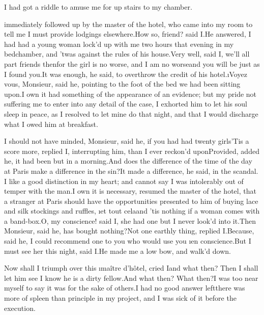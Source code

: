 \documentclass[twoside]{article}
\begin{document}
I had got a riddle to amuse me for\break
{}
up stairs to my chamber.






\vskip 6pt


 immediately followed up
by the master of the hotel, who came into
my room to tell me I must provide lodgings
elsewhere.\tskk How so, friend?  said
I.\tskk He answered, I had had a young
woman lock’d up with me two hours that
evening in my bedchamber, and ’twas
against the rules of his house.\tskk Very
well, said I, we’ll all part friends
then\tskk for the girl is no worse,\tskk
and I am no worse\tskk and you will be
just as I found you.\tskk It was enough,
he said, to overthrow the credit of his
hotel.\tskk \i{Voyez vous}, Monsieur, said
he, pointing to the foot of the bed we had
been sitting upon.\tskk I own it had
something of the appearance of an
evidence; but my pride not suffering me to
enter into any detail of the case, I
exhorted him to let his soul sleep in
peace, as I resolved to let mine do that
night, and that I would discharge what I
owed him at breakfast.

I should not have minded, Monsieur, said
he, if you had had twenty girls\tskk ’Tis
a score more, replied I, interrupting him,
than I ever reckon’d upon\tskk Provided,
added he, it had been but in a
morning.\tskk And does the difference of
the time of the day at Paris make a
difference in the sin?\tskk It made a
difference, he said, in the scandal.\tskk
I like a good distinction in my heart; and
cannot say I was intolerably out of temper
with the man.\tskk I own it is necessary,
resumed the master of the hotel, that a
stranger at Paris should have the
opportunities presented to him of buying
lace and silk stockings and ruffles, \i{et
tout cela}\tskk and ’tis nothing if a
woman comes with a band-box.\tskk O, my
conscience! said I, she had one but I
never look’d into it.\tskk Then Monsieur,
said he, has bought nothing?\tskk Not one
earthly thing, replied I.\tskk Because,
said he, I could recommend one to you who
would use you \i{en conscience}.\tskk But
I must see her this night, said I.\tskk He
made me a low bow, and walk’d down.

Now shall I triumph over this \i{maître
d’hôtel}, cried I\tskk and what then?
Then I shall let him see I know he is a
dirty fellow.\tskk And what then?  What
then?\tskk I was too near myself to say it
was for the sake of others.\tskk I had no
good answer left\tskk there was more of
spleen than principle in my project, and I
was sick of it before the execution.
\end{document}
